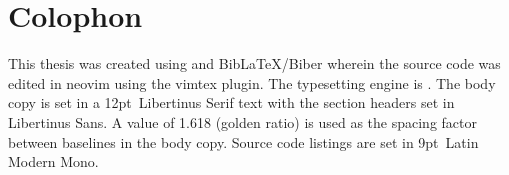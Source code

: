 
\chapter{Colophon}

This thesis was created using \LaTeXe{} and Bib\LaTeX{}/Biber wherein the source
code was edited in neovim using the vimtex plugin. The typesetting engine  is
. The body copy is set in a
12pt~Libertinus Serif text with the section headers set in Libertinus Sans. A
value of 1.618 (golden ratio) is used as the spacing factor between baselines
in the body copy. Source code listings are set in 9pt~Latin Modern Mono.
